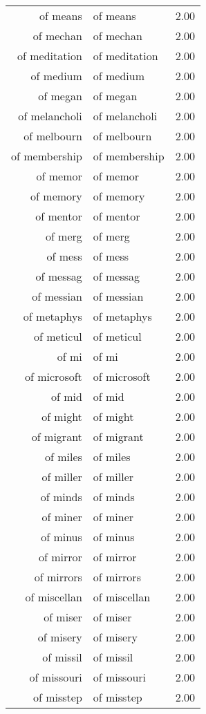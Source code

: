 \begin{table}[ht]
\begin{tabular}{rlr}
  of means & of means & 2.00 \\ 
  of mechan & of mechan & 2.00 \\ 
  of meditation & of meditation & 2.00 \\ 
  of medium & of medium & 2.00 \\ 
  of megan & of megan & 2.00 \\ 
  of melancholi & of melancholi & 2.00 \\ 
  of melbourn & of melbourn & 2.00 \\ 
  of membership & of membership & 2.00 \\ 
  of memor & of memor & 2.00 \\ 
  of memory & of memory & 2.00 \\ 
  of mentor & of mentor & 2.00 \\ 
  of merg & of merg & 2.00 \\ 
  of mess & of mess & 2.00 \\ 
  of messag & of messag & 2.00 \\ 
  of messian & of messian & 2.00 \\ 
  of metaphys & of metaphys & 2.00 \\ 
  of meticul & of meticul & 2.00 \\ 
  of mi & of mi & 2.00 \\ 
  of microsoft & of microsoft & 2.00 \\ 
  of mid & of mid & 2.00 \\ 
  of might & of might & 2.00 \\ 
  of migrant & of migrant & 2.00 \\ 
  of miles & of miles & 2.00 \\ 
  of miller & of miller & 2.00 \\ 
  of minds & of minds & 2.00 \\ 
  of miner & of miner & 2.00 \\ 
  of minus & of minus & 2.00 \\ 
  of mirror & of mirror & 2.00 \\ 
  of mirrors & of mirrors & 2.00 \\ 
  of miscellan & of miscellan & 2.00 \\ 
  of miser & of miser & 2.00 \\ 
  of misery & of misery & 2.00 \\ 
  of missil & of missil & 2.00 \\ 
  of missouri & of missouri & 2.00 \\ 
  of misstep & of misstep & 2.00 \\ 

\end{tabular}
\end{table}
